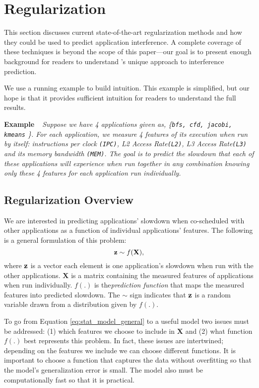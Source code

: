 \section{Regularization}
\label{sec:regression}
This section discusses current state-of-the-art regularization methods
and how they could be used to predict application interference.  A
complete coverage of these techniques is beyond the scope of this
paper---our goal is to present enough background for readers to
understand \SYSTEMESP{}'s unique approach to interference prediction.

We use a running example to build intuition.  This example is
simplified, but our hope is that it provides sufficient intuition for
readers to understand the full results.

\noindent \textbf{Example~~}\textit{Suppose we have 4 applications
  given as, \{\texttt{bfs, cfd, jacobi, kmeans} \}.  For each
  application, we measure 4 features of its execution when run by
  itself: instructions per clock \texttt{(IPC)}, L2 Access
  Rate\texttt{(L2)}, L3 Access Rate\texttt{(L3)} and its memory
  bandwidth \texttt{(MEM)}.  The goal is to predict the slowdown that
  each of these applications will experience when run together in any
  combination knowing only these 4 features for each application run
  individually.  }

\subsection{Regularization Overview}
We are interested in predicting applications' slowdown when
co-scheduled with other applications as a function of individual
applications' features. The following is a general formulation of this
problem:
\begin{equation}
\label{eq:stat_model_general}
\mathbf{z} \sim f(\mathbf{X}),
\end{equation}
where $\mathbf{z}$ is a vector each element is one application's slowdown when
run with the other applications.  $\mathbf{X}$ is a matrix containing
the measured features of applications when run individually.  $f(.)$
is the\emph{prediction function} that maps the measured features into
predicted slowdown.  The $\sim$ sign indicates that $\mathbf{z}$ is a random
variable drawn from a distribution given by $f(.)$.

To go from Equation \eqref{eq:stat_model_general} to a useful model
two issues must be addressed: (1) which features we choose to include
in $\mathbf{X}$ and (2) what function $f(.)$ best represents this
problem. In fact, these issues are intertwined; depending on the
features we include we can choose different functions.  It is
important to choose a function that captures the data without
overfitting so that the model's generalization error is small.  The
model also must be computationally fast so that it is practical.

